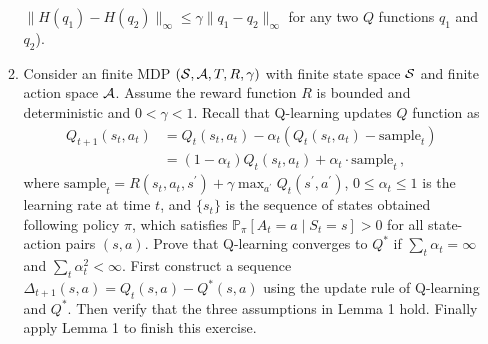 \documentclass{article}
\begin{document}
\begin{enumerate}
\begin{enumerate}
    $\|H(q_1)-H(q_2)\|_{\infty}\leq \gamma\|q_1-q_2\|_{\infty}$
    for any two $Q$ functions $q_1$ and $q_2$).
    \item	Consider an finite MDP  $({\mathcal{S}},{\mathcal{A}},T,R, \gamma)$ with finite state space ${\mathcal{S}}$ and finite action space ${\mathcal{A}}$. Assume the reward function $R$ is bounded and deterministic and $0<\gamma<1$. Recall that Q-learning updates $Q$ function as
    \begin{align*}
        Q_{t+1}(s_t,a_t)&=Q_t(s_t,a_t)-\alpha_t(Q_t(s_t,a_t)-\text{sample}_t)\\
        &=(1-\alpha_t)Q_t(s_t,a_t)+\alpha_t\cdot\text{sample}_t\,,
    \end{align*}
    where $\text{sample}_t=R(s_t,a_t,s^\prime)+\gamma\max_{a^\prime}Q_{t}(s^\prime,a^\prime)$, $0\leq \alpha_t\leq 1$ is the learning rate at time $t$, and $\{s_t\}$ is the sequence of states obtained
    following policy $\pi$, which satisfies 
    $\mathbb{P}_{\pi}\left[A_{t}=a \mid S_{t}=s\right]>0$ for all
    state-action pairs $(s,a)$. Prove that Q-learning converges to $Q^\ast$ if $\sum_{t} \alpha_{t}=\infty$ and $\sum_{t} \alpha^2_{t}<\infty$. First construct a sequence $\Delta_{t+1}(s,a)=Q_t(s,a)-Q^\ast(s,a)$ using the update rule of Q-learning and $Q^\ast$. Then verify that the three assumptions in Lemma 1 hold. Finally apply Lemma 1 to finish this exercise. 
    

\end{enumerate}
\end{enumerate}
\end{document}
